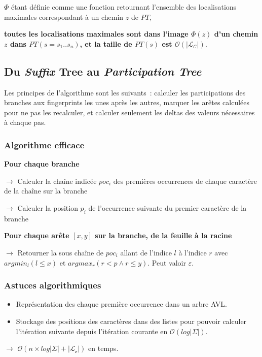 \documentclass[a4paper]{article}
\begin{document}
$\Phi$ étant définie comme une fonction retournant l'ensemble des localisations maximales correspondant à un chemin $z$ de $PT$, \newline

\textbf{toutes les localisations maximales sont dans l'image $\Phi(z)$ d'un chemin $z$ dans $PT(s = s_{1}..s_{n})$, et la taille de $PT(s)$ est $\mathcal{O}(|\mathcal{L}_{\mathcal{C}}|)$}.

\subsection{Du \emph{Suffix} Tree au \emph{Participation Tree}}

Les principes de l'algorithme sont les suivants~: calculer les participations des branches aux fingerprints les unes après les autres, marquer les arêtes calculées pour ne pas les recalculer, et calculer seulement les deltas des valeurs nécessaires à chaque pas.

\subsubsection*{Algorithme efficace}

\textbf{Pour chaque branche}

$\rightarrow$ Calculer la chaîne indicée $poc_i$ des premières occurrences de chaque caractère de la chaîne sur la branche

$\rightarrow$ Calculer la position $p_i$ de l'occurrence suivante du premier caractère de la branche

\textbf{Pour chaque arête $[x,y]$ sur la branche, de la feuille à la racine}

$\rightarrow$ Retourner la sous chaîne de $poc_i$ allant de l'indice $l$ à l'indice $r$ avec $argmin_l(l \leq x)$ et $argmax_r(r < p \land r \leq y)$. Peut valoir $\varepsilon$.

\subsubsection*{Astuces algorithmiques}
\begin{itemize}
\item Représentation des \og{}chaque première occurrence\fg{} dans un arbre AVL.
\item Stockage des positions des caractères dans des listes pour pouvoir calculer l'itération suivante depuis l'itération courante en $\mathcal{O}(log |\Sigma|)$. \newline
\end{itemize}
$\rightarrow$ $\mathcal{O}(n \times log |\Sigma| + |\mathcal{L}_\mathcal{c}|)$ en temps.
\end{document}
